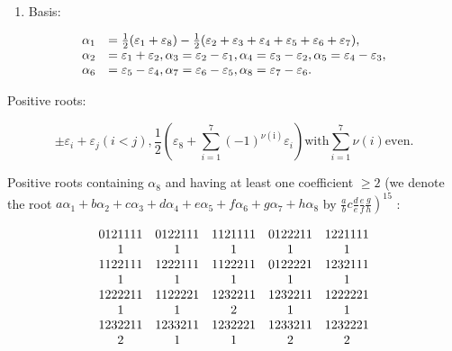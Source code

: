 \begin{enumerate}
\def\labelenumi{(\Roman{enumi})}
\setcounter{enumi}{1}
\tightlist
\item
  Basis:
\end{enumerate}

\[
\begin{array}{r l} \alpha_ {1} & = \frac {1}{2} (\varepsilon_ {1} + \varepsilon_ {8}) - \frac {1}{2} (\varepsilon_ {2} + \varepsilon_ {3} + \varepsilon_ {4} + \varepsilon_ {5} + \varepsilon_ {6} + \varepsilon_ {7}), \\ \alpha_ {2} & = \varepsilon_ {1} + \varepsilon_ {2}, \alpha_ {3} = \varepsilon_ {2} - \varepsilon_ {1}, \alpha_ {4} = \varepsilon_ {3} - \varepsilon_ {2}, \alpha_ {5} = \varepsilon_ {4} - \varepsilon_ {3}, \\ \alpha_ {6} & = \varepsilon_ {5} - \varepsilon_ {4}, \alpha_ {7} = \varepsilon_ {6} - \varepsilon_ {5}, \alpha_ {8} = \varepsilon_ {7} - \varepsilon_ {6}. \end{array}
\]

Positive roots:

\[
\pm \varepsilon_ {i} + \varepsilon_ {j} (i <   j), \frac {1}{2} (\varepsilon_ {8} + \sum_ {i = 1} ^ {7} (- 1) ^ {\nu (\mathrm{i})} \varepsilon_ {i}) \text {with} \sum_ {i = 1} ^ {7} \nu (i) \text {even}.
\]

Positive roots containing \(\alpha_{8}\) and having at least one coefficient \(\geqslant 2\) (we denote the root \(a\alpha_{1} + b\alpha_{2} + c\alpha_{3} + d\alpha_{4} + e\alpha_{5} + f\alpha_{6} + g\alpha_{7} + h\alpha_{8}\) by \(\left.\frac{a}{b}c\frac{d}{e}\frac{e}{f}\frac{g}{h}\right)^{15}\) :

\[
\begin{array}{c c c c c} 0   1   2   1   1   1   1 & 0   1   2   2   1   1   1 & 1   1   2   1   1   1   1 & 0   1   2   2   2   1   1 & 1   2   2   1   1   1   1 \\ 1 & 1 & 1 & 1 & 1 \\ 1   1   2   2   1   1   1 & 1   2   2   2   1   1   1 & 1   1   2   2   2   1   1 & 0   1   2   2   2   2   1 & 1   2   3   2   1   1   1 \\ 1 & 1 & 1 & 1 & 1 \\ 1   2   2   2   2   1   1 & 1   1   2   2   2   2   1 & 1   2   3   2   2   1   1 & 1   2   3   2   2   1   1 & 1   2   2   2   2   2   1 \\ 1 & 1 & 2 & 1 & 1 \\ 1   2   3   2   2   1   1 & 1   2   3   3   2   1   1 & 1   2   3   2   2   2   1 & 1   2   3   3   2   1   1 & 1   2   3   2   2   2   1 \\ 2 & 1 & 1 & 2 & 2 \end{array}
\]

